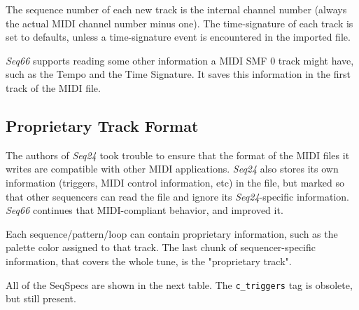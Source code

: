    The sequence number of each new track is the internal channel number
   (always the actual MIDI channel number minus one).
   The time-signature of each track is set to defaults, unless a
   time-signature event is encountered in the imported file.

   \textsl{Seq66} supports reading some other
   information a MIDI SMF 0 track might have, such as the Tempo and the
   Time Signature.  It saves this information in the first track
   of the MIDI file.

\subsection{Proprietary Track Format}
\label{subsec:proprietary_track_format}

   The authors of \textsl{Seq24} took trouble to ensure that the format
   of the MIDI files it writes are compatible with other MIDI applications.
   \textsl{Seq24} also stores its own information (triggers, MIDI control
   information, etc) in the file, but marked so that other sequencers can read
   the file and ignore its \textsl{Seq24}-specific information.
   \textsl{Seq66} continues that MIDI-compliant behavior, and improved it.

   Each sequence/pattern/loop can contain proprietary information, such as the
   palette color assigned to that track.
   The last chunk of sequencer-specific information, that covers the whole
   tune, is the "proprietary track".

   All of the SeqSpecs are shown in the next table.
   The \texttt{c\_triggers} tag is obsolete, but still present.

